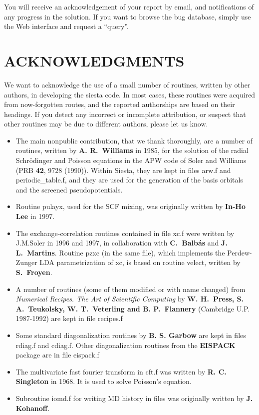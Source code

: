 \documentclass[11pt]{article}
\begin{document}
You will receive an acknowledgement of your report by email, and
notifications of any progress in the solution. If you want to browse
the bug database, simply use the Web interface and request a
``query''.

\section{ACKNOWLEDGMENTS}

We want to acknowledge the use of a small number of routines,
written by other authors, in developing the siesta code.
In most cases, these routines were acquired from now-forgotten 
routes, and the reported authorships are based on their headings.
If you detect any incorrect or incomplete attribution, or suspect
that other routines may be due to different authors, please
let us know.

\begin{itemize}
\item
The main nonpublic contribution, that we thank thoroughly, are a
number of routines, written by {\bf A. R.\ Williams} in 1985, for the
solution of the radial Schr\"odinger and Poisson equations in the APW
code of Soler and Williams (PRB {\bf 42}, 9728 (1990)).  Within
{\sc Siesta}, they are kept in files arw.f and periodic\_table.f, and they
are used for the generation of the basis orbitals and the screened
pseudopotentials.

\item
Routine pulayx, used for the SCF mixing, was originally written by
{\bf In-Ho Lee} in 1997.

\item
The exchange-correlation routines contained in file xc.f were written
by J.M.Soler in 1996 and 1997, in collaboration with {\bf C.\ Balb\'as} 
and {\bf J. L.\ Martins}.
Routine pzxc (in the same file), which implements the Perdew-Zunger
LDA parametrization of xc, is based on routine velect, written by
{\bf S.\ Froyen}.

\item
A number of routines (some of them modified or with name changed)
from {\em Numerical Recipes. The Art of Scientific Computing}
by {\bf W. H.\ Press, S. A.\ Teukolsky, W. T.\ Veterling and B. P.\ Flannery}
(Cambridge U.P. 1987-1992) are kept in file recipes.f

\item
Some standard diagonalization routines by {\bf B. S. Garbow} are kept
in files rdiag.f and cdiag.f. Other diagonalization routines from
the {\bf EISPACK} package are in file eispack.f

\item
The multivariate fast fourier transform in cft.f was written by
{\bf R. C. Singleton} in 1968. It is used to solve Poisson's equation.

\item
Subroutine iomd.f for writing MD history in files was originally written
by {\bf J. Kohanoff}.
\end{itemize}
\end{document}
